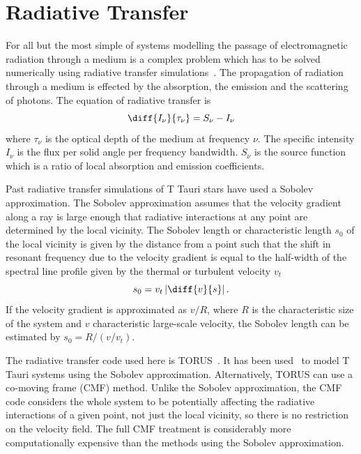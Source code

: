 \documentclass[fleqn,usenatbib]{mnras}
\begin{document}
\section{Radiative Transfer}
\label{sec:radiative}
For all but the most simple of systems modelling the passage of electromagnetic radiation through a medium is a complex problem which has to be solved numerically using radiative transfer simulations~\citep[see][]{2013ARA&A..51...63S}. The propagation of radiation through a medium is effected by the absorption, the emission and the scattering of photons. The equation of radiative transfer is
\begin{equation}
    \diff{I_{\nu}}{\tau_{\nu}} = S_{\nu} - I_{\nu}
\label{eq:RT}
\end{equation}
where $\tau_{\nu}$ is the optical depth of the medium at frequency $\nu$. The specific intensity $I_{\nu}$ is the flux per solid angle per frequency bandwidth. $S_{\nu}$ is the source function which is a ratio of local absorption and emission coefficients.


Past radiative transfer simulations of T Tauri stars have used a Sobolev approximation. The Sobolev approximation assumes that the velocity gradient along a ray is large enough that radiative interactions at any point are determined by the local vicinity. The Sobolev length  or characteristic length $s_0$ of the local vicinity is given by the distance from a point such that the shift in resonant frequency due to the velocity gradient is equal to the half-width of the spectral line profile given by the thermal or turbulent velocity $v_t$
\begin{equation}
    s_0 = v_t \left|\diff{v}{s}\right|{\rm .}
    \label{eq:sobolevlength}
\end{equation}
If the velocity gradient is approximated as $v/R$, where $R$ is the characteristic size of the system and $v$ characteristic large-scale velocity, the Sobolev length can be estimated by $s_0 = R/(v/v_t)$.

The radiative transfer code used here is TORUS~\citep{2019A&C....27...63H}. It has been used~\citep[e.g.][]{2005MNRAS.356.1489S} to model T Tauri systems using the Sobolev approximation. Alternatively, TORUS can use a co-moving frame (CMF) method. Unlike the Sobolev approximation, the CMF code considers the whole system to be potentially affecting the radiative interactions of a given point, not just the local vicinity, so there is no restriction on the velocity field. The full CMF treatment is considerably more computationally expensive than the methods using the Sobolev approximation.
\end{document}
